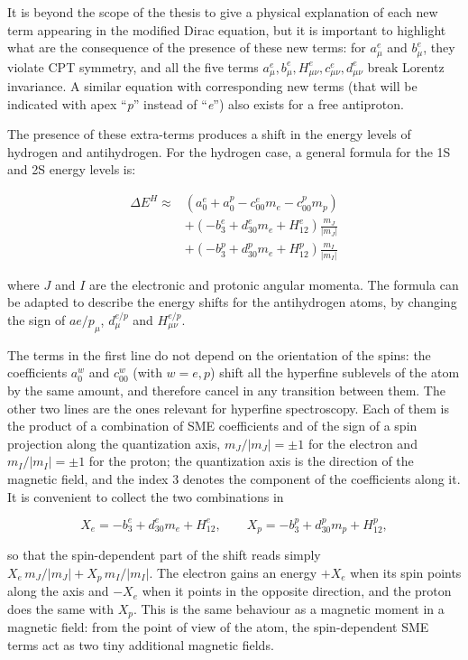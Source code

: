 It is beyond the scope of the thesis to give a physical explanation of each new term appearing in the modified Dirac equation, but it is important to highlight what are the consequence of the presence of these new terms: for $a^{e}_{\mu}$ and $b^{e}_{\mu}$, they violate CPT symmetry, and all the five terms $a^{e}_{\mu},b^{e}_{\mu},H^{e}_{\mu \nu},c^{e}_{\mu \nu},d^{e}_{\mu \nu}$ break Lorentz invariance. A similar equation with corresponding new terms (that will be indicated with apex ``\textit{p}'' instead of ``\textit{e}'') also exists for a free antiproton.

The presence of these extra-terms produces a shift in the energy levels of hydrogen and antihydrogen. For the hydrogen case, a general formula for the 1S and 2S energy levels is:

\begin{align}
\Delta E^{H} \approx &(a_{0}^{e} + a_{0}^{p} - c^{e}_{00} m_{e} - c^{p}_{00} m_{p}) \\
 & + (-b^{e}_{3} + d^{e}_{30} m_{e} + H^{e}_{12}) \frac{m_{J}}{|m_{J}|} \\
 & + (-b^{p}_{3} + d^{p}_{30} m_{e} + H^{p}_{12}) \frac{m_{I}}{|m_{I}|}
\end{align}

where $J$ and $I$ are the electronic and protonic angular momenta. The formula can be adapted to describe the energy shifts for the antihydrogen atoms, by changing the sign of $a{e/p}_{\mu}$, $d^{e/p}_{\mu}$ and $H^{e/p}_{\mu \nu}$.

The terms in the first line do not depend on the orientation of the spins: the coefficients $a^w_0$ and $c^w_{00}$ (with $w = e, p$) shift all the hyperfine sublevels of the atom by the same amount, and therefore cancel in any transition between them. The other two lines are the ones relevant for hyperfine spectroscopy. Each of them is the product of a combination of SME coefficients and of the sign of a spin projection along the quantization axis, $m_J/|m_J| = \pm 1$ for the electron and $m_I/|m_I| = \pm 1$ for the proton; the quantization axis is the direction of the magnetic field, and the index 3 denotes the component of the coefficients along it. It is convenient to collect the two combinations in

\begin{equation}
X_e = -b^e_3 + d^e_{30} m_e + H^e_{12}, \qquad X_p = -b^p_3 + d^p_{30} m_p + H^p_{12},
\label{eq:SMEXdef}
\end{equation}

so that the spin-dependent part of the shift reads simply $X_e\, m_J/|m_J| + X_p\, m_I/|m_I|$. The electron gains an energy $+X_e$ when its spin points along the axis and $-X_e$ when it points in the opposite direction, and the proton does the same with $X_p$. This is the same behaviour as a magnetic moment in a magnetic field: from the point of view of the atom, the spin-dependent SME terms act as two tiny additional magnetic fields.

